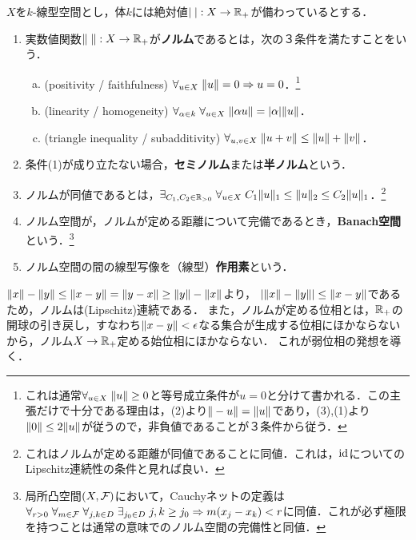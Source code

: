\documentclass[uplatex,dvipdfmx]{jsreport}
\begin{document}
\begin{definition}
    $X$を$k$-線型空間とし，体$k$には絶対値$\lvert\;\rvert:X\to\mathbb{R}_+$が備わっているとする．
    \begin{enumerate}
        \item 実数値関数$\|\;\|:X\to\mathbb{R}_+$が\textbf{ノルム}であるとは，次の３条件を満たすことをいう．
        \begin{enumerate}[(a)]
            \item (positivity / faithfulness) $\forall_{u\in X}\;\|u\|=0\Rightarrow u=0$．\footnote{これは通常$\forall_{u\in X}\;\|u\|\ge 0$と等号成立条件が$u=0$と分けて書かれる．この主張だけで十分である理由は，(2)より$\|-u\|=\|u\|$であり，(3),(1)より$\|0\|\le 2\|u\|$が従うので，非負値であることが３条件から従う．}
            \item (linearity / homogeneity) $\forall_{\alpha\in k}\;\forall_{u\in X}\;\|\alpha u\|=\lvert\alpha\rvert\|u\|$．
            \item (triangle inequality / subadditivity) $\forall_{u,v\in X}\;\|u+v\|\le\|u\|+\|v\|$．
        \end{enumerate}
        \item 条件(1)が成り立たない場合，\textbf{セミノルム}または\textbf{半ノルム}という．
        \item ノルムが同値であるとは，$\exists_{C_1,C_2\in\mathbb{R}_{>0}}\;\forall_{u\in X}\;C_1\|u\|_1\le\|u\|_2\le C_2\|u\|_1$．\footnote{これはノルムが定める距離が同値であることに同値．これは，$\mathrm{id}$についてのLipschitz連続性の条件と見れば良い．}
        \item ノルム空間が，ノルムが定める距離について完備であるとき，\textbf{Banach空間}という．\footnote{局所凸空間$(X,\mathcal{F})$において，Cauchyネットの定義は$\forall_{r>0}\;\forall_{m\in\mathcal{F}}\;\forall_{j,k\in D}\;\exists_{j_0\in D}\;j,k\ge j_0\Rightarrow m(x_j-x_k)<r$に同値．これが必ず極限を持つことは通常の意味でのノルム空間の完備性と同値．}
        \item ノルム空間の間の線型写像を（線型）\textbf{作用素}という．
    \end{enumerate}
\end{definition}
\begin{remarks}
    $\|x\|-\|y\|\le\|x-y\|=\|y-x\|\ge\|y\|-\|x\|$より，
    $\lvert\|x\|-\|y\|\rvert\le\|x-y\|$であるため，ノルムは(Lipschitz)連続である．
    また，ノルムが定める位相とは，$\mathbb{R}_+$の開球の引き戻し，すなわち$\|x-y\|<\epsilon$なる集合が生成する位相にほかならないから，ノルム$X\to\mathbb{R}_+$定める始位相にほかならない．
    これが弱位相の発想を導く．
\end{remarks}
\end{document}
